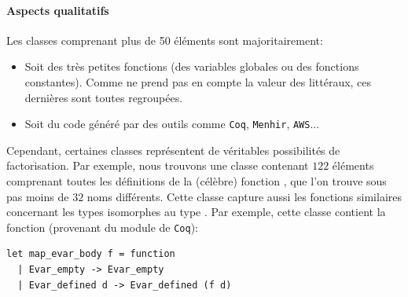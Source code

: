 \paragraph{Aspects qualitatifs}

Les classes comprenant plus de 50 éléments sont majoritairement:
\begin{itemize}
\item Soit des très petites fonctions (des variables globales ou des fonctions constantes). Comme {\Asak} ne prend pas en compte la valeur des littéraux, ces dernières sont toutes regroupées.
\item Soit du code généré par des outils comme \verb|Coq|, \verb|Menhir|, \verb|AWS|...
\end{itemize}

Cependant, certaines classes représentent de véritables possibilités de factorisation. Par exemple, nous trouvons une classe contenant $122$ éléments comprenant toutes les définitions de la (célèbre) fonction , que l'on trouve sous pas moins de $32$ noms différents. Cette classe capture aussi les fonctions similaires concernant les types isomorphes au type . Par exemple, cette classe contient la fonction  (provenant du module  de \verb|Coq|):

\begin{verbatim}
let map_evar_body f = function
  | Evar_empty -> Evar_empty
  | Evar_defined d -> Evar_defined (f d)
\end{verbatim}
